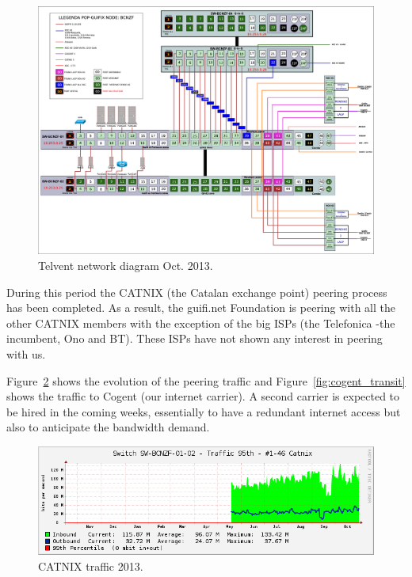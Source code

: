 \begin{figure}[H]
  \centering
  \includegraphics[width=0.95\linewidth]{sect3/figures/telvent_diagram.eps} 
  \caption[Telvent network diagram]{Telvent network diagram Oct. 2013.}
  \label{fig:telvent_diagram}
\end{figure}


During this period the CATNIX (the Catalan exchange point) peering process has been completed. As a result, the guifi.net Foundation is peering with all the other CATNIX members with the exception of the big ISPs (the Telefonica -the incumbent, Ono and BT). These ISPs have not shown any interest in peering with us.

Figure~\ref{fig:catnix_transit} shows the evolution of the peering traffic and Figure~\ref{fig:cogent_transit} shows the traffic to Cogent (our internet carrier). A second carrier is expected to be hired in the coming weeks, essentially to have a redundant internet access but also to anticipate the bandwidth demand.

\begin{figure}[H]
  \centering
  \includegraphics[width=0.95\linewidth]{sect3/figures/catnix.png} 
  \caption[CATNIX traffic 2013]{CATNIX traffic 2013.}
  \label{fig:catnix_transit}
\end{figure}

